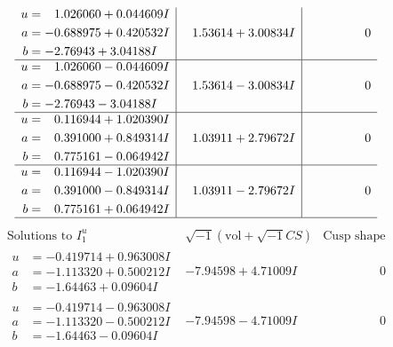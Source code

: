 \documentclass[1p]{elsarticle_modified}
\theoremstyle{definition}
\newcommand{\I}{\sqrt{-1}}
\begin{document}
$$\begin{array}{c|c|c}
\begin{aligned}
u &= \phantom{-}1.026060 + 0.044609 I \\
a &= -0.688975 + 0.420532 I \\
b &= -2.76943 + 3.04188 I\end{aligned}
 & \phantom{-}1.53614 + 3.00834 I & \phantom{-0.000000 } 0 \\ \hline\begin{aligned}
u &= \phantom{-}1.026060 - 0.044609 I \\
a &= -0.688975 - 0.420532 I \\
b &= -2.76943 - 3.04188 I\end{aligned}
 & \phantom{-}1.53614 - 3.00834 I & \phantom{-0.000000 } 0 \\ \hline\begin{aligned}
u &= \phantom{-}0.116944 + 1.020390 I \\
a &= \phantom{-}0.391000 + 0.849314 I \\
b &= \phantom{-}0.775161 - 0.064942 I\end{aligned}
 & \phantom{-}1.03911 + 2.79672 I & \phantom{-0.000000 } 0 \\ \hline\begin{aligned}
u &= \phantom{-}0.116944 - 1.020390 I \\
a &= \phantom{-}0.391000 - 0.849314 I \\
b &= \phantom{-}0.775161 + 0.064942 I\end{aligned}
 & \phantom{-}1.03911 - 2.79672 I & \phantom{-0.000000 } 0\\
 \hline 
 \end{array}$$\newpage$$\begin{array}{c|c|c}  
\text{Solutions to }I^u_{1}& \I (\text{vol} + \sqrt{-1}CS) & \text{Cusp shape}\\
 \hline 
\begin{aligned}
u &= -0.419714 + 0.963008 I \\
a &= -1.113320 + 0.500212 I \\
b &= -1.64463 + 0.09604 I\end{aligned}
 & -7.94598 + 4.71009 I & \phantom{-0.000000 } 0 \\ \hline\begin{aligned}
u &= -0.419714 - 0.963008 I \\
a &= -1.113320 - 0.500212 I \\
b &= -1.64463 - 0.09604 I\end{aligned}
 & -7.94598 - 4.71009 I & \phantom{-0.000000 } 0 \\ \hline\begin{aligned}

\end{aligned}
\end{array}$$
\end{document}
